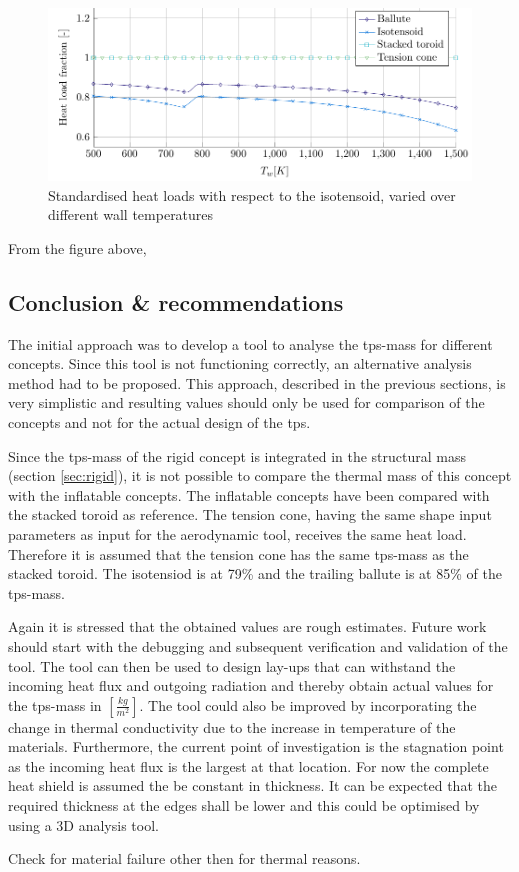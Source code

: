 \begin{figure}[H]
	\centering
	\includegraphics{Figure/heatload.pdf}
	\caption{Standardised heat loads with respect to the isotensoid, varied over different wall temperatures}
	\label{fig:heatload}
\end{figure}

From the figure above, 

\subsection{Conclusion \& recommendations}
The initial approach was to develop a tool to analyse the \gls{tps}-mass for different concepts. Since this tool is not functioning correctly, an alternative analysis method had to be proposed. This approach, described in the previous sections, is very simplistic and resulting values should only be used for comparison of the concepts and not for the actual design of the \gls{tps}.

Since the \gls{tps}-mass of the rigid concept is integrated in the structural mass (section \ref{sec:rigid}), it is not possible to compare the thermal mass of this concept with the inflatable concepts. The inflatable concepts have been compared with the stacked toroid as reference. The tension cone, having the same shape input parameters as input for the aerodynamic tool, receives the same heat load. Therefore it is assumed that the tension cone has the same \gls{tps}-mass as the stacked toroid. The isotensiod is at 79\% and the trailing ballute is at 85\% of the \gls{tps}-mass.

Again it is stressed that the obtained values are rough estimates. Future work should start with the debugging and subsequent verification and validation of the tool. The tool can then be used to design lay-ups that can withstand the incoming heat flux and outgoing radiation and thereby obtain actual values for the \gls{tps}-mass in $\left[\frac{kg}{m^2}\right]$. The tool could also be improved by incorporating the change in thermal conductivity due to the increase in temperature of the materials. Furthermore, the current point of investigation is the stagnation point as the incoming heat flux is the largest at that location. For now the complete heat shield is assumed the be constant in thickness. It can be expected that the required thickness at the edges shall be lower and this could be optimised by using a 3D analysis tool.


Check for material failure other then for thermal reasons.
